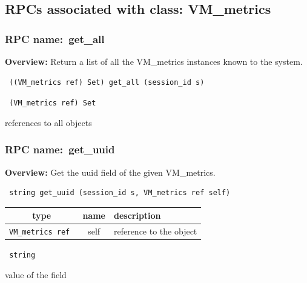 \subsection{RPCs associated with class: VM\_metrics}
\subsubsection{RPC name:~get\_all}

{\bf Overview:} 
Return a list of all the VM\_metrics instances known to the system.

\begin{verbatim} ((VM_metrics ref) Set) get_all (session_id s)\end{verbatim}


\vspace{0.3cm}

{\tt 
(VM\_metrics ref) Set
}


references to all objects
\vspace{0.3cm}
\vspace{0.3cm}
\vspace{0.3cm}
\subsubsection{RPC name:~get\_uuid}

{\bf Overview:} 
Get the uuid field of the given VM\_metrics.

\begin{verbatim} string get_uuid (session_id s, VM_metrics ref self)\end{verbatim}



 
\vspace{0.3cm}
\begin{tabular}{|c|c|p{7cm}|}
 \hline
{\bf type} & {\bf name} & {\bf description} \\ \hline
{\tt VM\_metrics ref } & self & reference to the object \\ \hline 

\end{tabular}

\vspace{0.3cm}

{\tt 
string
}


value of the field
\vspace{0.3cm}
\vspace{0.3cm}
\vspace{0.3cm}
